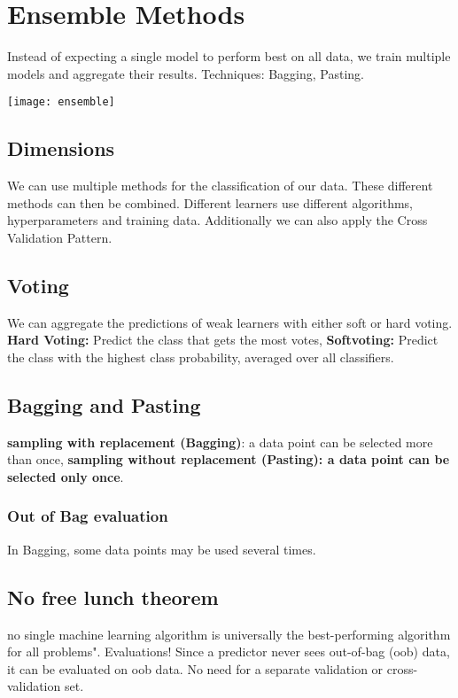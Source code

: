 \section{Ensemble Methods}
\begin{minipage}{0,5\linewidth}
	Instead of expecting a single model to perform best on all data, we train multiple models and aggregate their results. Techniques: Bagging, Pasting. 
\end{minipage}
\begin{minipage}{0,5\linewidth}
	\texttt{[image: ensemble]}  
\end{minipage}

\subsection{Dimensions}
We can use multiple methods for the classification of our data. These different methods can then be combined. Different learners use different algorithms, hyperparameters and training data. Additionally we can also apply the Cross Validation Pattern.

\subsection{Voting}
We can aggregate the predictions of weak learners with either soft or hard voting.\\
\textbf{Hard Voting:} Predict the class that gets the most votes, \textbf{Softvoting:} Predict the class with the highest class probability, averaged over all classifiers.
 
\subsection{Bagging and Pasting}
\textbf{sampling with replacement (Bagging)}: a data point can be selected more than once, \textbf{sampling without replacement (Pasting): a data point can be selected only once}.

\subsubsection{Out of Bag evaluation}
 In Bagging, some data points may be used several times. 

\subsection{No free lunch theorem}
no single machine learning algorithm is universally the best-performing algorithm for all problems". Evaluations! Since a predictor never sees out-of-bag (oob) data, it can be evaluated on oob data. No need for a separate validation or cross-validation set.